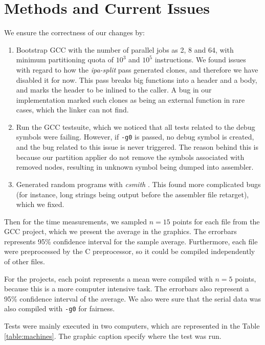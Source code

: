 \documentclass[runningheads]{llncs}
\begin{document}
\section{Methods and Current Issues}\label{sec:methods}

We ensure the correctness of our changes by:
\begin{enumerate}
	\item Bootstrap GCC with the number of parallel jobs as 2, 8 and 64, with
	minimum partitioning quota of $10^3$ and $10^5$ instructions. We found issues
	with regard to how the \textit{ipa-split} pass generated clones, and therefore
	we have disabled it for now. This pass breaks big functions
	into a header and a body, and marks the header to be inlined to the caller.
	A bug in our implementation marked such clones as being an external function in
	rare cases, which the linker can not find.

	\item Run the GCC testsuite, which we noticed that all tests related to the debug
	symbols were failing. However, if \texttt{-g0} is passed, no debug symbol is created,
	and the bug related to this issue is never triggered. The reason behind this is
	because our partition applier do not remove the symbols associated with removed
	nodes, resulting in unknown symbol being dumped into assembler.

	\item Generated random programs with \textit{csmith} \cite{yang2011finding}. This found more complicated
	bugs (for instance, long strings being output before the assembler file retarget),
	which we fixed.
\end{enumerate}

Then for the time measurements, we sampled $n = 15$ points for each file from
the GCC project, which we present the average in the graphics. The errorbars
represents 95\% confidence interval for the sample average. Furthermore, each
file were preprocessed by the C preprocessor, so it could be compiled independently
of other files.

For the projects, each point represents a mean were compiled with $n = 5$ points,
because this is a more computer intensive task. The errorbars also represent a 95\%
confidence interval of the average. We also were sure that the serial data was also
compiled with \texttt{-g0} for fairness.

Tests were mainly executed in two computers, which are represented
in the Table \ref{table:machines}. The graphic caption specify where the test
was run.
\end{document}
